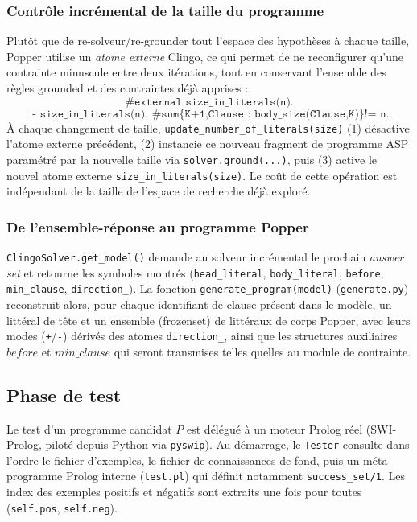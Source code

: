 \subsubsection{Contrôle incrémental de la taille du programme}

Plutôt que de re-sol\-veur/re-\allowbreak grounder tout l'espace des
hypothèses à chaque taille, Popper utilise un \emph{atome externe}
Clingo, ce qui permet de ne reconfigurer qu'une contrainte minuscule
entre deux itérations, tout en conservant l'ensemble des règles
grounded et des contraintes déjà apprises :
\[
  \texttt{\#external size\_in\_literals(n).}
\]
\[
  \texttt{:- size\_in\_literals(n), \#sum\{K+1,Clause : body\_size(Clause,K)\} != n.}
\]
À chaque changement de taille, \texttt{update\_number\_of\_literals(size)}
(1) désactive l'atome externe précédent, (2) instancie ce nouveau
fragment de programme ASP paramétré par la nouvelle taille via
\texttt{solver.ground(...)}, puis (3) active le nouvel atome externe
\texttt{size\_in\_literals(size)}. Le coût de cette opération est
indépendant de la taille de l'espace de recherche déjà exploré.

\subsubsection{De l'ensemble-réponse au programme Popper}

\texttt{ClingoSolver.get\_model()} demande au solveur incrémental le
prochain \emph{answer set} et retourne les symboles \og montrés \fg{}
(\texttt{head\_literal}, \texttt{body\_literal}, \texttt{before},
\texttt{min\_clause}, \texttt{direction\_}). La fonction
\texttt{generate\_program(model)} (\texttt{generate.py}) reconstruit
alors, pour chaque identifiant de clause présent dans le modèle, un
littéral de tête et un ensemble (frozenset) de littéraux de corps
Popper, avec leurs modes (\texttt{+}/\texttt{-}) dérivés des atomes
\texttt{direction\_}, ainsi que les structures auxiliaires
$\mathit{before}$ et $\mathit{min\_clause}$ qui seront transmises telles
quelles au module de contrainte.

\subsection{Phase de test}
\label{sec:popper-test}

Le test d'un programme candidat $P$ est délégué à un moteur Prolog réel
(SWI-Prolog, piloté depuis Python via \texttt{pyswip}). Au démarrage, le
\texttt{Tester} consulte dans l'ordre le fichier d'exemples, le fichier
de connaissances de fond, puis un méta-programme Prolog interne
(\texttt{test.pl}) qui définit notamment \texttt{success\_set/1}. Les
index des exemples positifs et négatifs sont extraits une fois pour
toutes (\texttt{self.pos}, \texttt{self.neg}).

